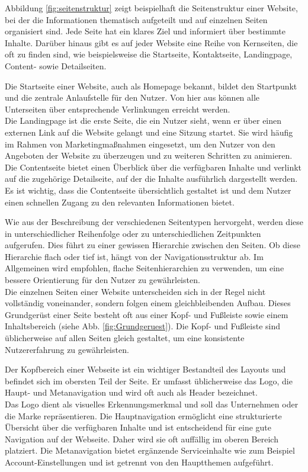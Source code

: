 Abbildung \ref{fig:seitenstruktur} zeigt beispielhaft die Seitenstruktur einer Website, bei der die Informationen thematisch aufgeteilt und auf einzelnen Seiten organisiert sind. Jede Seite hat ein klares Ziel und informiert über bestimmte Inhalte. Darüber hinaus gibt es auf jeder Website eine Reihe von Kernseiten, die oft zu finden sind, wie beispielsweise die Startseite, Kontaktseite, Landingpage, Content- sowie Detailseiten.

Die Startseite einer Website, auch als Homepage bekannt, bildet den Startpunkt und die zentrale Anlaufstelle für den Nutzer. Von hier aus können alle Unterseiten über entsprechende Verlinkungen erreicht werden. \\
Die Landingpage ist die erste Seite, die ein Nutzer sieht, wenn er über einen externen Link auf die Website gelangt und eine Sitzung startet. Sie wird häufig im Rahmen von Marketingmaßnahmen eingesetzt, um den Nutzer von den Angeboten der Website zu überzeugen und zu weiteren Schritten zu animieren. \\
Die Contentseite bietet einen Überblick über die verfügbaren Inhalte und verlinkt auf die zugehörige Detailseite, auf der die Inhalte ausführlich dargestellt werden. Es ist wichtig, dass die Contentseite übersichtlich gestaltet ist und dem Nutzer einen schnellen Zugang zu den relevanten Informationen bietet.

Wie aus der Beschreibung der verschiedenen Seitentypen hervorgeht, werden diese in unterschiedlicher Reihenfolge oder zu unterschiedlichen Zeitpunkten aufgerufen. Dies führt zu einer gewissen Hierarchie zwischen den Seiten. Ob diese Hierarchie flach oder tief ist, hängt von der Navigationsstruktur ab. Im Allgemeinen wird empfohlen, flache Seitenhierarchien zu verwenden, um eine bessere Orientierung für den Nutzer zu gewährleisten. \\
Die einzelnen Seiten einer Website unterscheiden sich in der Regel nicht vollständig voneinander, sondern folgen einem gleichbleibenden Aufbau. Dieses Grundgerüst einer Seite besteht oft aus einer Kopf- und Fußleiste sowie einem Inhaltsbereich (siehe Abb. \ref{fig:Grundgeruest}). Die Kopf- und Fußleiste sind üblicherweise auf allen Seiten gleich gestaltet, um eine konsistente Nutzererfahrung zu gewährleisten.

Der Kopfbereich einer Webseite ist ein wichtiger Bestandteil des Layouts und befindet sich im obersten Teil der Seite. Er umfasst üblicherweise das Logo, die Haupt- und Metanavigation und wird oft auch als Header bezeichnet. \\
Das Logo dient als visuelles Erkennungsmerkmal und soll das Unternehmen oder die Marke repräsentieren. Die Hauptnavigation ermöglicht eine strukturierte Übersicht über die verfügbaren Inhalte und ist entscheidend für eine gute Navigation auf der Webseite. Daher wird sie oft auffällig im oberen Bereich platziert. Die Metanavigation bietet ergänzende Serviceinhalte wie zum Beispiel Account-Einstellungen und ist getrennt von den Hauptthemen aufgeführt. \\

